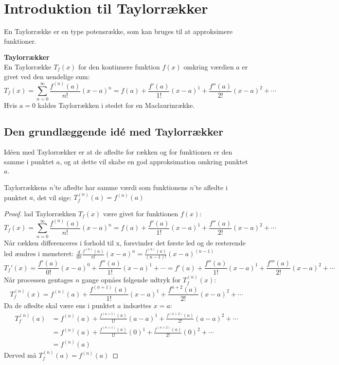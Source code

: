 \chapter{Introduktion til Taylorrækker}
\label{ch:tr}
En Taylorrække er en type potensrække, som kan bruges til at approksimere funktioner.
\begin{defn}
    \textbf{Taylorrækker}\\
    En Taylorrække $T_f(x)$ for den kontinuere funktion $f(x)$ omkring værdien $a$ er givet ved den uendelige sum:
    \[
        T_f(x) = \sum^{\infty}_{n=0} \frac{f^{(n)}(a)}{n!} (x-a)^{n}
        = f(a) + \frac{f'(a)}{1!}(x-a)^{1} + \frac{f''(a)}{2!}(x-a)^{2} + \cdots
    \]
    Hvis $a = 0$ kaldes Taylorrækken i stedet for en Maclaurinrække.
\end{defn}
\section{Den grundlæggende idé med Taylorrækker}
\label{def:taylorrække} Idéen med Taylorrækker er at de afledte for rækken og for funktionen er den samme i punktet $a$, 
og at dette vil skabe en god approksimation omkring punktet $a$. 
\begin{thm}
    Taylorrækkens $n$'te afledte har samme værdi som funktionens $n$'te afledte i punktet $a$, 
    det vil sige: $T_f^{(n)}(a) = f^{(n)} (a)$
\end{thm}
\begin{proof}
    lad Taylorrækken $T_f(x)$ være givet for funktionen $f(x)$: 
    \[
        T_f(x) = \sum^{\infty}_{n=0} \frac{f^{(n)}(a)}{n!} (x-a)^{n}
        = f(a) + \frac{f'(a)}{1!}(x-a)^{1} + \frac{f''(a)}{2!}(x-a)^{2} + \cdots
    \]
    Når rækken differenceres i forhold til x, forsvinder det første led og de resterende led ændres i mønsteret: $\frac{d}{dx} \frac{f^{(n)}(a)}{n!} (x-a)^{n} = \frac{f^{(n)}(a)}{(n-1)!} (x-a)^{(n - 1)}$ %
    \[
        T_f'(x) = \frac{f'(a)}{0!}(x-a)^0 + \frac{f''(a)}{1!}(x-a)^{1} + \cdots = f'(a) + \frac{f''(a)}{1!}(x-a)^{1} + \frac{f'''(a)}{2!}(x-a)^{2} + \cdots
    \]
    Når processen gentages $n$ gange opnåes følgende udtryk for $T_f^{(n)}(x)$:
    \[
        T_f^{(n)}(x) = f^{(n)}(a) + \frac{f^{(n + 1)}(a)}{1!}(x-a)^{1} + \frac{f^{n + 2}(a)}{2!}(x-a)^{2} + \cdots
    \]
    Da de afledte skal være ens i punktet $a$ indsættes $x = a$:
    \begin{align*}
        T_f^{(n)}(a) &= f^{(n)}(a) + \frac{f^{(n + 1)}(a)}{1!}(a-a)^{1} + \frac{f^{(n + 2)}(a)}{2!}(a-a)^{2} + \cdots \\
                   &= f^{(n)}(a) + \frac{f^{(n + 1)}(a)}{1!}(0)^{1} + \frac{f^{(n + 2)}(a)}{2!}(0)^{2} + \cdots \\
                   &= f^{(n)}(a)        
    \end{align*}
    Derved må $T_f^{(n)}(a) = f^{(n)}(a)$
\end{proof}
